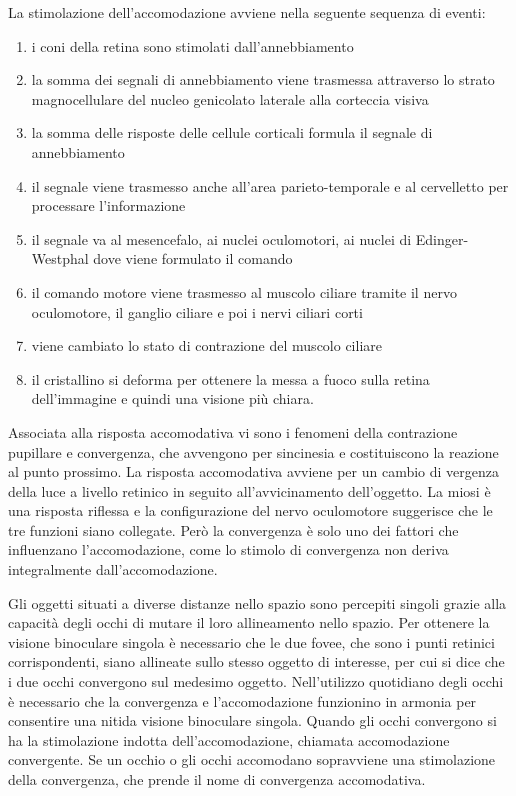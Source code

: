 La stimolazione dell’accomodazione avviene nella seguente sequenza di eventi:
 \begin{enumerate}
  \itemsep-0.5em 
 \item i coni della retina sono stimolati dall’annebbiamento
 \item la somma dei segnali di annebbiamento viene trasmessa attraverso lo strato magnocellulare del nucleo genicolato laterale alla corteccia visiva
 \item la somma delle risposte delle cellule corticali formula il segnale di annebbiamento
 \item il segnale viene trasmesso anche all’area parieto-temporale e al cervelletto per processare l’informazione
 \item il segnale va al mesencefalo, ai nuclei oculomotori, ai nuclei di Edinger-Westphal dove viene formulato il comando
 \item il comando motore viene trasmesso al muscolo ciliare tramite il nervo oculomotore, il ganglio ciliare e poi i nervi ciliari corti
 \item viene cambiato lo stato di contrazione del muscolo ciliare
 \item il cristallino si deforma per ottenere la messa a fuoco sulla retina dell’immagine e quindi una visione più chiara.
\end{enumerate}

Associata alla risposta accomodativa vi sono i fenomeni della contrazione pupillare e convergenza, che avvengono per sincinesia e costituiscono la reazione al punto prossimo. La risposta accomodativa avviene per un cambio di vergenza della luce a livello retinico in seguito all’avvicinamento dell’oggetto. La miosi è una risposta riflessa e la configurazione del nervo oculomotore suggerisce che le tre funzioni siano collegate. Però la convergenza è solo uno dei fattori che influenzano l’accomodazione, come lo stimolo di convergenza non deriva integralmente dall’accomodazione.

Gli oggetti situati a diverse distanze nello spazio sono percepiti singoli grazie alla capacità degli occhi di mutare il loro allineamento nello spazio. Per ottenere la visione binoculare singola è necessario che le due fovee, che sono i punti retinici corrispondenti, siano allineate sullo stesso oggetto di interesse, per cui si dice che i due occhi convergono sul medesimo oggetto. 
Nell’utilizzo quotidiano degli occhi è necessario che la convergenza e l’accomodazione funzionino in armonia per consentire una nitida visione binoculare singola. Quando gli occhi convergono si ha la stimolazione indotta dell’accomodazione, chiamata accomodazione convergente. Se un occhio o gli occhi accomodano sopravviene una stimolazione della convergenza, che prende il nome di convergenza accomodativa. 

